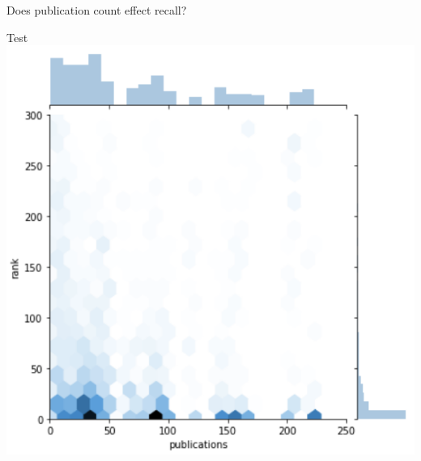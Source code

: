 \documentclass[10pt]{beamer}
\begin{document}
\begin{frame}{Does publication count effect recall?}
\begin{multicols}{2}
    Test
  \includegraphics[width=\columnwidth]{./Test.png}
  \end{multicols}
\end{frame}
\end{document}
